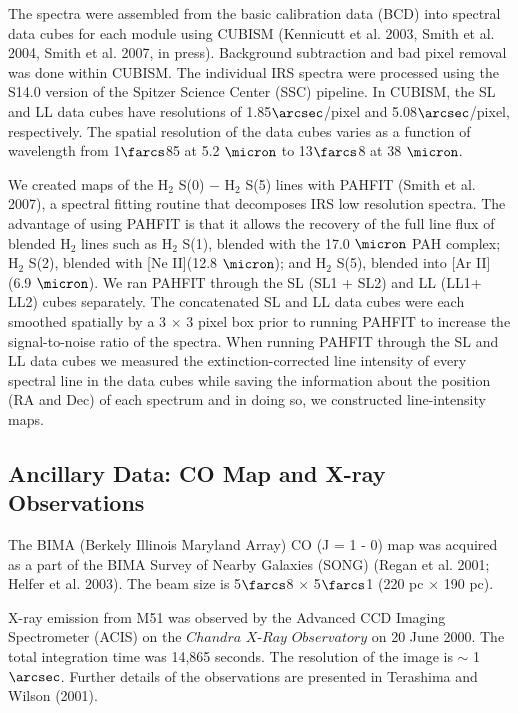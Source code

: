 \documentclass[manuscript]{aastex}
\begin{document}
The spectra were assembled from the basic calibration data (BCD) into spectral data cubes for each module using CUBISM (Kennicutt et al. 2003, Smith et al. 2004, Smith et al. 2007, in press).  Background subtraction and bad pixel removal was done within CUBISM.  The individual IRS spectra were processed using the S14.0 version of the Spitzer Science Center (SSC) pipeline.  In CUBISM, the SL and LL data cubes have resolutions of 1.85$\arcsec$/pixel and 5.08$\arcsec$/pixel, respectively.  The spatial resolution of the data cubes varies as a function of wavelength from 1$\farcs$85 at 5.2 $\micron$ to 13$\farcs$8 at 38 $\micron$.  %

We created maps of the $\mathrm{H_2}$ S(0) $-$ $\mathrm{H_2}$ S(5) lines with PAHFIT (Smith et al. 2007), a spectral fitting routine that decomposes IRS low resolution spectra.  The advantage of using PAHFIT is that it allows the recovery of the full line flux of blended $\mathrm{H_2}$ lines such as $\mathrm{H_2}$ S(1), blended with the 17.0 $\micron$ PAH complex; $\mathrm{H_2}$ S(2), blended with [Ne II](12.8 $\micron$); and $\mathrm{H_2}$ S(5), blended into [Ar II](6.9 $\micron$).   We ran PAHFIT through the SL (SL1 + SL2) and LL (LL1+ LL2)  cubes separately.  The concatenated SL and LL data cubes were each smoothed spatially by a 3 $\times$ 3 pixel box prior to running PAHFIT to increase the signal-to-noise ratio of the spectra.  When running PAHFIT through the SL and LL data cubes we measured the extinction-corrected line intensity of every spectral line in the data cubes while saving the information about the position (RA and Dec) of each spectrum and in doing so, we constructed line-intensity maps.

\subsection{Ancillary Data: CO Map and X-ray Observations}

The BIMA (Berkely Illinois Maryland Array) CO (J = 1 - 0) map was acquired as a part of the BIMA Survey of  Nearby Galaxies (SONG) (Regan et al. 2001; Helfer et al. 2003).  The beam size is 5$\farcs$8 $\times$ 5$\farcs$1 (220 pc $\times$ 190 pc).

X-ray emission from M51 was observed by the Advanced CCD Imaging Spectrometer (ACIS) on the $Chandra$ $X$-$Ray$ $Observatory$ on 20 June 2000.  The total integration time was 14,865 seconds.  The resolution of the image is $\sim$ 1$\arcsec$.  Further details of the observations are presented in Terashima and Wilson (2001).
\end{document}
